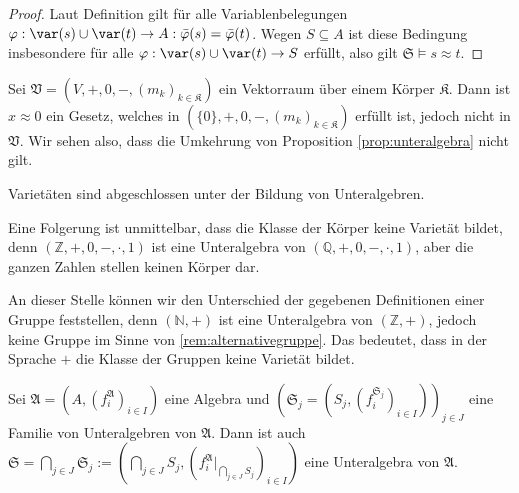 \begin{proof}
    Laut Definition gilt für alle Variablenbelegungen $\varphi:\var(s)\cup \var(t)\to A:\bar{\varphi}(s)=\bar{\varphi}(t)$.
    Wegen $S\subseteq A$ ist diese Bedingung insbesondere für alle $\varphi : \var(s) \cup \var(t) \to S$ erfüllt, also gilt $\mathfrak{S}\models s\approx t$.
\end{proof}

\begin{remark}
    Sei $\mathfrak{V}=(V,+,0,-,(m_k)_{k\in\mathfrak{K}})$ ein Vektorraum über einem Körper $\mathfrak{K}$.
    Dann ist $x\approx 0$ ein Gesetz, welches in $(\{0\},+,0,-,(m_k)_{k\in\mathfrak{K}})$ erfüllt ist, jedoch nicht in $\mathfrak{V}$.
    Wir sehen also, dass die Umkehrung von Proposition \ref{prop:unteralgebra} nicht gilt.
\end{remark}

\begin{corollary}\label{corollary:sub-varietaeten}
    Varietäten sind abgeschlossen unter der Bildung von Unteralgebren.
\end{corollary}

\begin{remark}
    Eine Folgerung ist unmittelbar, dass die Klasse der Körper keine Varietät bildet,
    denn $(\mathbb{Z},+,0,-,\cdot,1)$ ist eine Unteralgebra von $(\mathbb{Q},+,0,-,\cdot,1)$, aber die ganzen Zahlen stellen keinen Körper dar.
\end{remark}

\begin{remark}
    An dieser Stelle können wir den Unterschied der gegebenen Definitionen einer Gruppe feststellen,
    denn $(\mathbb{N},+)$ ist eine Unteralgebra von $(\mathbb{Z},+)$, jedoch keine Gruppe im Sinne von 
    \cref{rem:alternativegruppe}. Das bedeutet, dass in der Sprache $+$ die Klasse der Gruppen keine Varietät bildet.
\end{remark}

\vspace*{-\lineskip}

\begin{proposition}
    Sei $\mathfrak{A}=(A,(f^\mathfrak{A}_i)_{i\in I})$ eine Algebra und $(\mathfrak{S}_j = (S_j, (f_i^{\mathfrak{S}_j})_{i \in I}))_{j\in J}$ eine Familie von Unteralgebren
    von $\mathfrak{A}$. Dann ist auch $\mathfrak{S} = \bigcap_{j \in J} \mathfrak{S}_j := (\bigcap_{j\in J}S_j,(f^\mathfrak{A}_i\vert_{\bigcap_{j\in J}S_j})_{i\in I})$ eine Unteralgebra von $\mathfrak{A}$.
\end{proposition}

